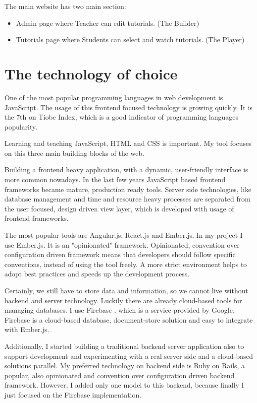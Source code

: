 \documentclass[12pt, a4paper, oneside, openright, medskipamount]{report}
\begin{document}
\noindent The main website has two main section:
\begin{itemize}[noitemsep]
\item Admin page where Teacher can edit tutorials. (The Builder)
\item Tutorials page where Students can select and watch tutorials. (The Player)
\end{itemize}

\section{The technology of choice}

One of the most popular programming languages in web development is JavaScript. The usage of this frontend focused technology is growing quickly.  It is the 7th on Tiobe Index, which is a good indicator of programming languages popularity. \cite{tiobe}

Learning and teaching JavaScript, HTML and CSS is important. My tool focuses on this three main building blocks of the web.

Building a frontend heavy application, with a dynamic, user-friendly interface is more common nowadays. In the last few years JavaScript based frontend frameworks became mature, production ready tools. Server side technologies, like database management and time and resource heavy processes are separated from the user focused, design driven view layer, which is developed with usage of frontend frameworks.

The most popular tools are Angular.js, React.js and Ember.js. In my project I use Ember.js. It is an "opinionated" framework. Opinionated, convention over configuration driven framework means that developers should follow specific conventions, instead of using the tool freely. A more strict environment helps to adopt best practices and speeds up the development process.

Certainly, we still have to store data and information, so we cannot live without backend and server technology. Luckily there are already cloud-based tools for managing databases. I use Firebase \cite{firebase}, which is a service provided by Google. Firebase is a cloud-based database, document-store solution and easy to integrate with Ember.js.

Additionally, I started building a traditional backend server application also to support development and experimenting with a real server side and a cloud-based solutions parallel. My preferred technology on backend side is Ruby on Rails, a popular, also opinionated and convention over configuration driven backend framework. However, I added only one model to this backend, because finally I just focused on the Firebase implementation.
\end{document}
